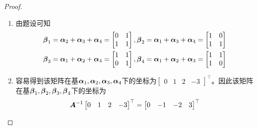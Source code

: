 \begin{proof}
    \begin{enumerate}
        \item {
              由题设可知
              \begin{align*}
                  \boldsymbol{\beta}_1 & =\boldsymbol{\alpha}_2+\boldsymbol{\alpha}_3+\boldsymbol{\alpha}_4=\begin{bmatrix}0&1\\1&1\end{bmatrix},
                  \boldsymbol{\beta}_2=\boldsymbol{\alpha}_1+\boldsymbol{\alpha}_3+\boldsymbol{\alpha}_4=\begin{bmatrix}1&0\\1&1\end{bmatrix}     \\
                  \boldsymbol{\beta}_3 & =\boldsymbol{\alpha}_1+\boldsymbol{\alpha}_2+\boldsymbol{\alpha}_4=\begin{bmatrix}1&1\\0&1\end{bmatrix},
                  \boldsymbol{\beta}_4=\boldsymbol{\alpha}_1+\boldsymbol{\alpha}_2+\boldsymbol{\alpha}_3=\begin{bmatrix}1&1\\1&0\end{bmatrix}
              \end{align*}
              }
        \item {
              容易得到该矩阵在基\(\boldsymbol{\alpha}_1,\boldsymbol{\alpha}_2,\boldsymbol{\alpha}_3,\boldsymbol{\alpha}_4\)下的坐标为\(\begin{bmatrix}0&1&2&-3\end{bmatrix}^\top\)。因此该矩阵在基\(\boldsymbol{\beta}_1,\boldsymbol{\beta}_2,\boldsymbol{\beta}_3,\boldsymbol{\beta}_4\)下的坐标为
              \begin{equation*}
                  {\boldsymbol{A}}^{-1}\begin{bmatrix}0&1&2&-3\end{bmatrix}^\top=\begin{bmatrix}0&-1&-2&3\end{bmatrix}^\top
              \end{equation*}
              }
    \end{enumerate}
\end{proof}

